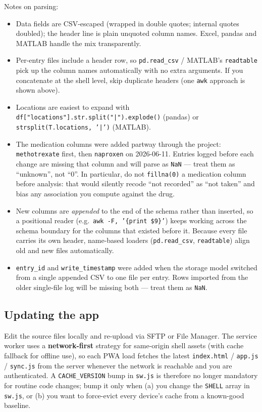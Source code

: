 \documentclass[11pt,a4paper]{article}
\begin{document}
Notes on parsing:
\begin{itemize}[leftmargin=*,nosep]
  \item Data fields are CSV-escaped (wrapped in double quotes; internal quotes doubled); the header line is plain unquoted column names. Excel, pandas and MATLAB handle the mix transparently.
  \item Per-entry files include a header row, so \texttt{pd.read\_csv} / MATLAB's \texttt{readtable} pick up the column names automatically with no extra arguments. If you concatenate at the shell level, skip duplicate headers (one \texttt{awk} approach is shown above).
  \item Locations are easiest to expand with \texttt{df["locations"].str.split("|").explode()} (pandas) or \texttt{strsplit(T.locations, '|')} (MATLAB).
  \item The medication columns were added partway through the project: \texttt{methotrexate} first, then \texttt{naproxen} on 2026-06-11. Entries logged before each change are missing that column and will parse as \texttt{NaN} --- treat them as ``unknown'', not ``0''. In particular, do not \texttt{fillna(0)} a medication column before analysis: that would silently recode ``not recorded'' as ``not taken'' and bias any association you compute against the drug.
  \item New columns are \emph{appended} to the end of the schema rather than inserted, so a positional reader (e.g.\ \texttt{awk -F, '\{print \$9\}'}) keeps working across the schema boundary for the columns that existed before it. Because every file carries its own header, name-based loaders (\texttt{pd.read\_csv}, \texttt{readtable}) align old and new files automatically.
  \item \texttt{entry\_id} and \texttt{write\_timestamp} were added when the storage model switched from a single appended CSV to one file per entry. Rows imported from the older single-file log will be missing both --- treat them as \texttt{NaN}.
\end{itemize}

\subsection{Updating the app}
Edit the source files locally and re-upload via SFTP or File Manager. The service worker uses a \textbf{network-first} strategy for same-origin shell assets (with cache fallback for offline use), so each PWA load fetches the latest \texttt{index.html} / \texttt{app.js} / \texttt{sync.js} from the server whenever the network is reachable and you are authenticated. A \texttt{CACHE\_VERSION} bump in \texttt{sw.js} is therefore no longer mandatory for routine code changes; bump it only when (a) you change the \texttt{SHELL} array in \texttt{sw.js}, or (b) you want to force-evict every device's cache from a known-good baseline.
\end{document}
